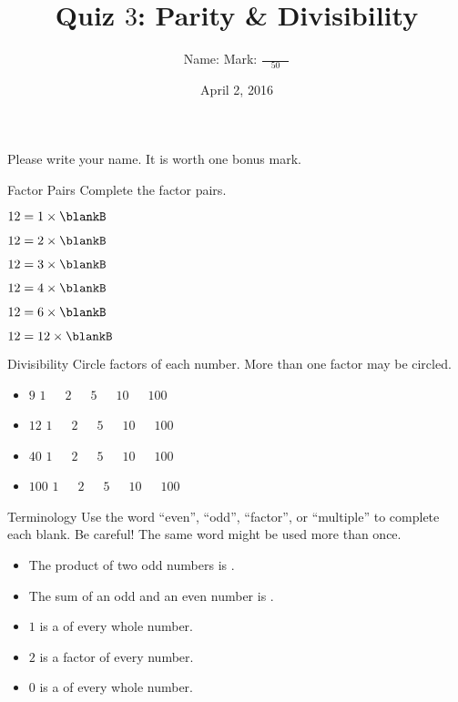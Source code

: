 \documentclass[12pt,letterpaper]{article}
\title{Quiz $3$: Parity \& Divisibility}
\author{Name: \underline{\hspace{5cm}} Mark: $\displaystyle \frac{\hspace{3em}}{50}$}
\date{April 2, 2016}
\begin{document}
\maketitle

Please write your name. It is worth one bonus mark.

\thispagestyle{empty}

\begin{problem}{Factor Pairs}
 Complete the factor pairs.

 \begin{itemize}
  \begin{multicols}{2}
   \item $12 = 1 \times \blankB$
   \item $12 = 2 \times \blankB$
   \item $12 = 3 \times \blankB$
   \item $12 = 4 \times \blankB$
   \item $12 = 6 \times \blankB$
   \item $12 = 12 \times \blankB$
  \end{multicols}
 \end{itemize}

\end{problem}

\begin{problem}{Divisibility}
 Circle factors of each number. More than one factor may be circled.

 \begin{itemize}
  \item $9$ \hfill $1$~~~$2$~~~$5$~~~$10$~~~$100$
  \item $12$ \hfill $1$~~~$2$~~~$5$~~~$10$~~~$100$
  \item $40$ \hfill $1$~~~$2$~~~$5$~~~$10$~~~$100$
  \item $100$ \hfill $1$~~~$2$~~~$5$~~~$10$~~~$100$
 \end{itemize}
\end{problem}

\begin{problem}{Terminology}
 Use the word ``even'', ``odd'', ``factor'', or ``multiple'' to complete each
 blank. Be careful! The same word might be used more than once.

 \begin{itemize}
  \item The product of two odd numbers is \underline{\hspace{6em}}.
  \item The sum of an odd and an even number is \underline{\hspace{6em}}.
  \item $1$ is a \underline{\hspace{6em}} of every whole number.
  \item $2$ is a factor of every \underline{\hspace{6em}} number.
  \item $0$ is a \underline{\hspace{6em}} of every whole number.
 \end{itemize}

\end{problem}
\end{document}
